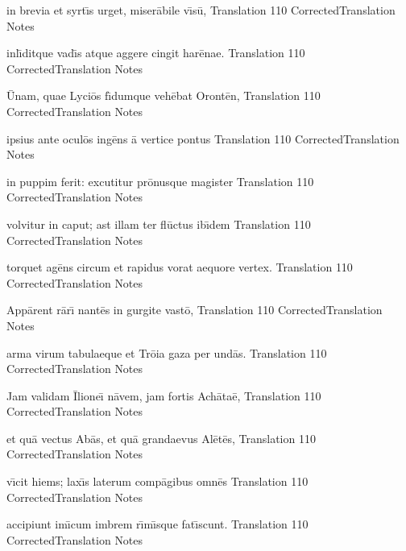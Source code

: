 \latline
  {in brevia et syrt\={\macron \i}s urget, miser\={\macron a}bile v\={\macron \i}s\={\macron u},}
  { Translation }
  {110}
  { CorrectedTranslation }
  { Notes }


\latline
  {inl\={\macron \i}ditque vad\={\macron \i}s atque aggere cingit har\={\macron e}nae.}
  { Translation }
  {110}
  { CorrectedTranslation }
  { Notes }


\newpage

\latline
  {\={\macron U}nam, quae Lyci\={\macron o}s f\={\macron \i}dumque veh\={\macron e}bat Oront\={\macron e}n,}
  { Translation }
  {110}
  { CorrectedTranslation }
  { Notes }


\latline
  {ipsius ante ocul\={\macron o}s ing\={\macron e}ns \={\macron a} vertice pontus}
  { Translation }
  {110}
  { CorrectedTranslation }
  { Notes }


\latline
  {in puppim ferit:  excutitur pr\={\macron o}nusque magister}
  { Translation }
  {110}
  { CorrectedTranslation }
  { Notes }


\newpage

\latline
  {volvitur in caput; ast illam ter fl\={\macron u}ctus ib\={\macron \i}dem}
  { Translation }
  {110}
  { CorrectedTranslation }
  { Notes }


\latline
  {torquet ag\={\macron e}ns circum et rapidus vorat aequore vertex.}
  { Translation }
  {110}
  { CorrectedTranslation }
  { Notes }


\latline
  {App\={\macron a}rent r\={\macron a}r\={\macron \i} nant\={\macron e}s in gurgite vast\={\macron o},}
  { Translation }
  {110}
  { CorrectedTranslation }
  { Notes }


\newpage

\latline
  {arma virum tabulaeque et Tr\={\macron o}ia gaza per und\={\macron a}s.}
  { Translation }
  {110}
  { CorrectedTranslation }
  { Notes }


\latline
  {Jam validam \={\macron I}lione\={\macron \i} n\={\macron a}vem, jam fortis Ach\={\macron a}ta\={\macron e},}
  { Translation }
  {110}
  { CorrectedTranslation }
  { Notes }


\latline
  {et qu\={\macron a} vectus Ab\={\macron a}s, et qu\={\macron a} grandaevus Al\={\macron e}t\={\macron e}s,}
  { Translation }
  {110}
  { CorrectedTranslation }
  { Notes }


\newpage

\latline
  {v\={\macron \i}cit hiems; lax\={\macron \i}s laterum comp\={\macron a}gibus omn\={\macron e}s}
  { Translation }
  {110}
  { CorrectedTranslation }
  { Notes }


\latline
  {accipiunt im\={\macron \i}cum imbrem r\={\macron \i}m\={\macron \i}sque fat\={\macron \i}scunt.}
  { Translation }
  {110}
  { CorrectedTranslation }
  { Notes }

